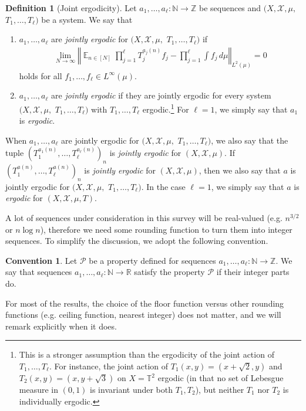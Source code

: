 \documentclass[11pt]{amsart}
\theoremstyle{definition}
\newtheorem{convention}{Convention}
\newtheorem{definition}[lemma]{Definition}
\DeclareMathOperator*{\E}{\mathbb{E}}
\newcommand{\N}{{\mathbb N}}
\newcommand{\R}{{\mathbb R}}
\newcommand{\T}{{\mathbb T}}
\newcommand{\Z}{{\mathbb Z}}
\newcommand{\CP}{{\mathcal P}}
\newcommand{\CX}{{\mathcal X}}
\newcommand{\norm}[1]{\left\Vert #1\right\Vert}
\newcommand{\1}{{\mathbf{1}}}
\newcommand{\floor}[1]{{\left \lfloor #1 \right \rfloor}}
\begin{document}
\begin{definition}[Joint ergodicity]\label{D: joint ergodicity}
    Let $a_1, \ldots, a_\ell:\N\to\Z$ be sequences and $(X, \CX, \mu,$\! $T_1, \ldots, T_\ell)$ be a system. We say that 
 \begin{enumerate}
\item $a_1, \ldots, a_\ell$ are \emph{jointly ergodic} for $(X, \CX, \mu,$\! $T_1, \ldots, T_\ell)$ if
\begin{align}\label{E: joint ergodicity}
        \lim_{N\to\infty}\norm{\E_{n\in[N]}\prod_{j=1}^\ell T_j^{{a_{j}(n)}}f_j - \prod_{j=1}^\ell \int f_j\, d\mu}_{L^2(\mu)} = 0
    \end{align}
    holds for all $f_1, \ldots, f_\ell\in L^\infty(\mu)$. %
    \item $a_1, \ldots, a_\ell$ are \emph{jointly ergodic} if they are jointly ergodic for every system $(X, \CX, \mu,$\! $T_1, \ldots, T_\ell)$ with $T_1, \ldots, T_\ell$ ergodic.\footnote{This is a stronger assumption than the ergodicity of the joint action of $T_1, \ldots, T_\ell$. For instance, the joint action of $T_1(x,y) = (x+\sqrt{2},y)$ and $T_2(x,y)=(x,y+\sqrt{3})$ on $X=\T^2$ ergodic (in that no set of Lebesgue measure in $(0,1)$ is invariant under both $T_1, T_2$), but neither $T_1$ nor $T_2$ is individually ergodic.} For $\ell=1$, we simply say that $a_1$ is \emph{ergodic}. 
    \end{enumerate}
\end{definition}
When $a_1, \ldots, a_\ell$ are jointly ergodic for $(X, \CX, \mu,$\! $T_1, \ldots, T_\ell)$, we also say that the tuple $(T_1^{{a_1(n)}}, \ldots, T_\ell^{{a_\ell(n)}})_n$ is \emph{jointly ergodic} for $(X, \CX, \mu)$. If $(T_1^{{a(n)}}, \ldots, T_\ell^{{a(n)}})_n$ is \emph{jointly ergodic} for $(X, \CX, \mu)$, then we also say that $a$ is jointly ergodic for $(X, \CX, \mu,$\! $T_1, \ldots, T_\ell)$. In the case $\ell=1$, we simply say that $a$ is \emph{ergodic} for $(X, \CX, \mu, T)$.


A lot of sequences under consideration in this survey will be real-valued (e.g. $n^{3/2}$ or $n\log n$), therefore we need some rounding function to turn them into integer sequences. To simplify the discussion, we adopt the following convention.
\begin{convention}\label{Conv: real sequences}
    Let $\CP$ be a property defined for sequences $a_1, \ldots, a_\ell:\N\to\Z$. We say that sequences $a_1, \ldots, a_\ell:\N\to\R$ satisfy the property $\CP$ if their integer parts do.
\end{convention}
For most of the results, the choice of the floor function versus other rounding functions (e.g. ceiling function, nearest integer) does not matter, and we will remark explicitly when it does. 
\end{document}
